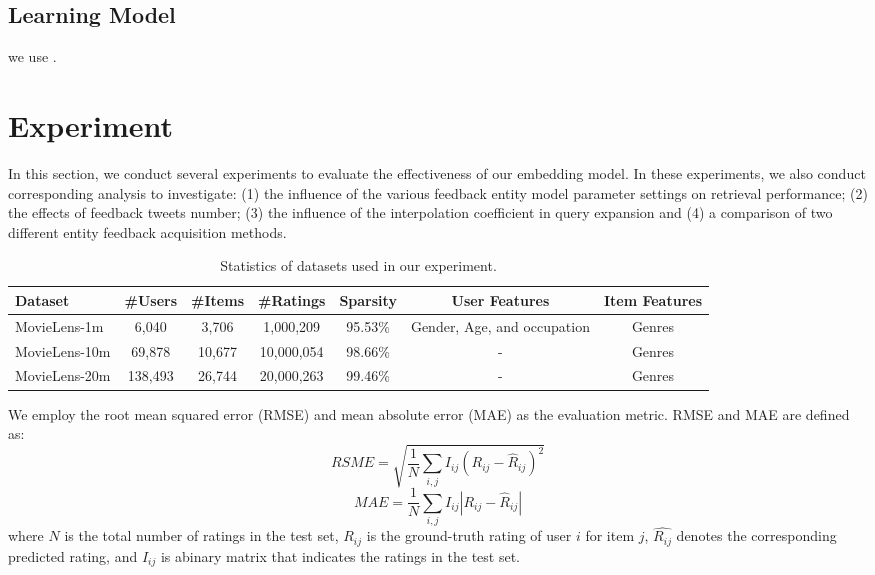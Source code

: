 \documentclass{sig-alternate-05-2015}
\begin{document}
\subsection{Learning Model}
we use \cite{chen2012svdfeature}.


\section{Experiment}
In this section, we conduct several experiments to evaluate the effectiveness of our embedding model.
In these experiments, we also conduct corresponding analysis to investigate:
(1) the influence of the various feedback entity model parameter settings on
retrieval performance;
(2) the effects of feedback tweets number;
(3) the influence of the interpolation coefficient in query expansion and
(4) a comparison of two different entity feedback acquisition methods.



\begin{table}[htpb]
	\centering
	\caption{Statistics of datasets used in our experiment.}
	\label{tab:topics}
	\begin{tabular}{|l|c|c|c|c|c|c|}
		\hline
		\textbf{Dataset} & \textbf{\#Users} & \textbf{\#Items} & \textbf{\#Ratings} & \textbf{Sparsity} & \textbf{User Features} & \textbf{Item Features} \\
		\hline
		MovieLens-1m  & 6,040   & 3,706  & 1,000,209  & 95.53\% & Gender, Age, and occupation & Genres \\
		MovieLens-10m & 69,878  & 10,677 & 10,000,054 & 98.66\% & - & Genres \\
		MovieLens-20m & 138,493 & 26,744 & 20,000,263 & 99.46\% & - & Genres \\
		\hline
	\end{tabular}
\end{table}



We employ the root mean squared error (RMSE) and mean absolute error (MAE) as the evaluation metric.
RMSE and MAE are defined as:
$$ RSME = \sqrt{ \frac{1}{N} \sum_{i,j} I_{ij} (R_{ij} - \hat{R}_{ij})^2 } $$
$$ MAE = \frac{1}{N} \sum_{i,j} I_{ij} |R_{ij} - \hat{R}_{ij}| $$
where $N$ is the total number of ratings in the test set,
$R_{ij}$ is the ground-truth rating of user $i$ for item $j$,
$\hat{R_{ij}}$ denotes the corresponding predicted rating,
and $I_{ij}$ is abinary matrix that indicates the ratings in the test set.
\end{document}
